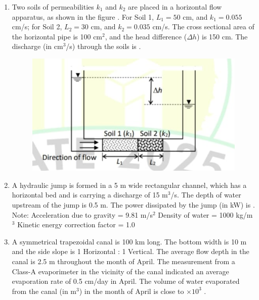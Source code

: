 \documentclass[journal,12pt,onecolumn]{article}
\theoremstyle{remark}
\begin{document}
\begin{enumerate}
\hfill{}

\item Two soils of permeabilities $k_1$ and $k_2$ are placed in a horizontal flow apparatus, as shown in the figure . For Soil 1, $L_1 = 50$ cm, and $k_1 = 0.055$ cm/s; for Soil 2, $L_2 = 30$ cm, and $k_2 = 0.035$ cm/s. The cross sectional area of the horizontal pipe is 100 cm$^2$, and the head difference ($\Delta h$) is 150 cm. The discharge (in cm$^3$/s) through the soils is \underline{\hspace{2cm}} .
\begin{figure}[H]
    \centering
    \includegraphics[width=0.7\columnwidth]{figs/1q-59.jpg}
    \caption{}
    \label{fig:q59}
\end{figure}

\hfill{}

\item A hydraulic jump is formed in a 5 m wide rectangular channel, which has a horizontal bed and is carrying a discharge of 15 m$^3$/s. The depth of water upstream of the jump is 0.5 m. The power dissipated by the jump (in kW) is \underline{\hspace{2cm}} .
Note:
Acceleration due to gravity = 9.81 m/s$^2$
Density of water = 1000 kg/m$^3$
Kinetic energy correction factor = 1.0

\hfill{}

\item A symmetrical trapezoidal canal is 100 km long. The bottom width is 10 m and the side slope is 1 Horizontal : 1 Vertical. The average flow depth in the canal is 2.5 m throughout the month of April. The measurement from a Class-A evaporimeter in the vicinity of the canal indicated an average evaporation rate of 0.5 cm/day in April.
The volume of water evaporated from the canal (in m$^3$) in the month of April is close to \underline{\hspace{2cm}} $\times 10^3$ .


\end{enumerate}
\end{document}
